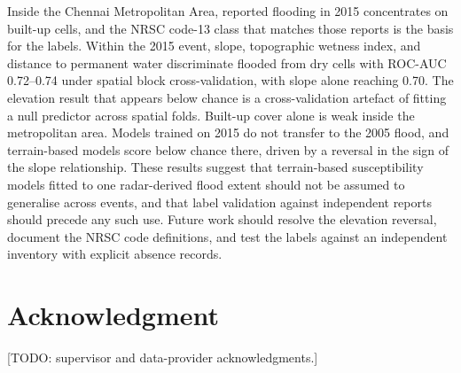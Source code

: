 \documentclass[conference]{IEEEtran}
\begin{document}
Inside the Chennai Metropolitan Area, reported flooding in 2015 concentrates on built-up cells, and the NRSC code-13 class that matches those reports is the basis for the labels. Within the 2015 event, slope, topographic wetness index, and distance to permanent water discriminate flooded from dry cells with ROC-AUC 0.72--0.74 under spatial block cross-validation, with slope alone reaching 0.70. The elevation result that appears below chance is a cross-validation artefact of fitting a null predictor across spatial folds. Built-up cover alone is weak inside the metropolitan area. Models trained on 2015 do not transfer to the 2005 flood, and terrain-based models score below chance there, driven by a reversal in the sign of the slope relationship. These results suggest that terrain-based susceptibility models fitted to one radar-derived flood extent should not be assumed to generalise across events, and that label validation against independent reports should precede any such use. Future work should resolve the elevation reversal, document the NRSC code definitions, and test the labels against an independent inventory with explicit absence records.

\section*{Acknowledgment}
[TODO: supervisor and data-provider acknowledgments.]



\end{document}
